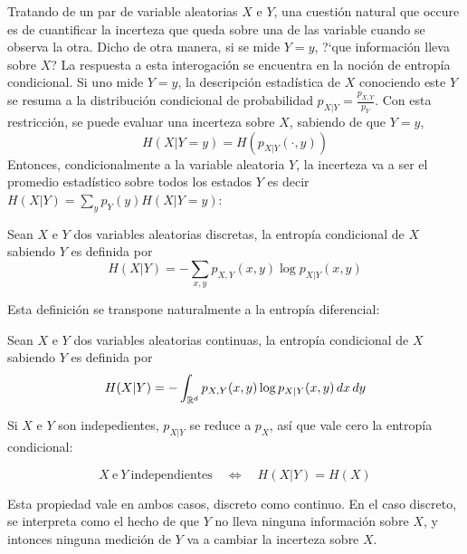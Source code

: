 \label{s:SZ:Mutua}

Tratando de un par de variable  aleatorias $X$ e $Y$, una cuesti\'on natural que
occure es de cuantificar la incerteza que queda sobre una de las variable cuando
se  observa  la  otra.  Dicho  de  otra  manera, si  se  mide  $Y  =  y$,  ?`que
informaci\'on lleva sobre  $X$? La respuesta a esta  interogaci\'on se encuentra
en la  noci\'on de entrop\'ia condicional. Si  uno mide $Y =  y$, la descripci\'on
estad\'istica de $X$ conociendo este $Y$ se resuma a la distribuci\'on condicional
de  probabilidad $p_{X|Y}  = \frac{p_{X,Y}}{p_Y}$.   Con esta  restricci\'on, se
puede  evaluar una  incerteza sobre  $X$, sabiendo  de que  $Y=y$,
%
\[
H(X|Y=y) = H\left( p_{X|Y}(\cdot,y) \right)
\]
%
Entonces, condicionalmente a la variable aleatoria $Y$, la incerteza va a ser el
promedio  estad\'istico sobre  todos los  estados $Y$  es decir  $H(X|Y)  = \sum_y
p_Y(y) H(X|Y=y)$:
%
\begin{definicion}\label{def:SZ:entropiacondicional}
  Sean $X$ e $Y$ dos  variables aleatorias discretas, la entrop\'ia condicional de
  $X$ sabiendo  $Y$ es  definida por
  \[
  H(X|Y) = - \sum_{x,y} p_{X,Y}(x,y) \log p_{X|Y}(x,y)
  \]
\end{definicion}
%
Esta definici\'on se transpone naturalmente a la entrop\'ia diferencial:
%
\begin{definicion}\label{def:SZ:entropiadiferencialcondicional}
  Sean $X$ e $Y$ dos  variables aleatorias continuas, la entrop\'ia condicional de
  $X$ sabiendo $Y$ es definida por
  \[
  H(X|Y) = - \int_{\mathbb{R}^d} p_{X,Y}(x,y) \log p_{X|Y}(x,y) \, dx \, dy
  \]
\end{definicion}

Si $X$ e $Y$ son indepedientes, $p_{X|Y}$ se reduce a $p_X$, as\'i que vale cero
la entrop\'ia condicional:
%
\begin{propiedades}
\item\label{prop:SZ:independenciacondicional}
  \[
  X \: \mbox{e} \: Y \: \mbox{independientes} \quad \Leftrightarrow \quad H(X|Y)
  = H(X)
  \]
\end{propiedades}
%
Esta  propiedad  vale  en ambos  casos,  discreto  como  continuo.  En  el  caso
discreto, se interpreta como el hecho  de que $Y$ no lleva ninguna informaci\'on
sobre $X$, y intonces ninguna medici\'on  de $Y$ va a cambiar la incerteza sobre
$X$.

